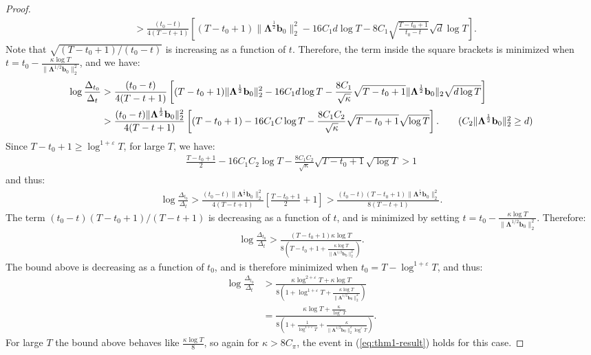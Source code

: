 \begin{proof}
\begin{align*}
    &> \frac{(t_0 - t) }{4(T-t+1)}\left[(T-t_0+1)\lVert\boldsymbol{\Lambda}^{\frac{1}{2}} \mathbf{b}_0\rVert^2_2 -16C_1d\log T - 8C_1\sqrt{\frac{T-t_0+1}{t_0-t}}\sqrt{d}\log T\right]. \tag{$T-t+1 > T - t_0+1$}
\end{align*}
Note that $\sqrt{(T-t_0+1)/(t_0-t)}$ is increasing as a function of $t$. Therefore, the term inside the square brackets is minimized when $t = t_0 - \frac{\kappa\log T}{\lVert\boldsymbol{\Lambda}^{1/2}\mathbf{b}_0\rVert_2^2}$, and we have:
\begin{align*}
    \log \frac{\Delta_{t_0}}{\Delta_t} &> \frac{(t_0 - t) }{4(T-t+1)}\left[(T-t_0+1)\lVert\boldsymbol{\Lambda}^{\frac{1}{2}} \mathbf{b}_0\rVert^2_2 -16C_1d\log T - \frac{8C_1}{\sqrt{\kappa}}\sqrt{T-t_0+1}\lVert\boldsymbol{\Lambda}^{\frac{1}{2}} \mathbf{b}_0\rVert_2\sqrt{d\log T}\right] \\
    &> \frac{(t_0 - t) \lVert\boldsymbol{\Lambda}^{\frac{1}{2}} \mathbf{b}_0\rVert^2_2}{4(T-t+1)}\left[(T-t_0+1) -16C_1C\log T - \frac{8C_1C_2 }{\sqrt{\kappa}}\sqrt{T-t_0+1}\sqrt{\log T}\right]. \tag{$C_2 \lVert\boldsymbol{\Lambda}^{\frac{1}{2}}\mathbf{b}_0\rVert_2^2 \geq d$}
\end{align*}
Since $T-t_0+1\geq \log^{1+\varepsilon} T$, for large $T$, we have: 
\begin{align*}
    \frac{T-t_0+1}{2} -16C_1C_2 \log T - \frac{8C_1C_2 }{\sqrt{\kappa}}\sqrt{T-t_0+1}\sqrt{\log T} > 1
\end{align*}
and thus:
\begin{align*}
    \log \frac{\Delta_{t_0}}{\Delta_t} > \frac{(t_0 - t) \lVert\boldsymbol{\Lambda}^{\frac{1}{2}} \mathbf{b}_0\rVert^2_2}{4(T-t+1)} \left[\frac{T-t_0+1}{2} + 1 \right ] >\frac{(t_0 - t)(T-t_0+1) \lVert\boldsymbol{\Lambda}^{\frac{1}{2}} \mathbf{b}_0\rVert^2_2}{8(T-t+1)}.
\end{align*}
The term $(t_0 - t)(T-t_0+1) / (T-t+1)$ is decreasing as a function of $t$, and is minimized by setting  $t = t_0 - \frac{\kappa\log T}{\lVert\boldsymbol{\Lambda}^{1/2}\mathbf{b}_0\rVert_2^2}$. Therefore:
\begin{align*}
    \log \frac{\Delta_{t_0}}{\Delta_t} > \frac{(T-t_0+1) \kappa\log T}{8\left(T-t_0+1 + \frac{\kappa\log T}{\lVert\boldsymbol{\Lambda}^{1/2}\mathbf{b}_0\rVert_2^2} \right)}.
\end{align*}
The bound above is decreasing as a function of $t_0$, and is therefore minimized when $t_0 = T - \log^{1+\varepsilon} T$, and thus:
\begin{align*}
    \log \frac{\Delta_{t_0}}{\Delta_t} &> \frac{\kappa\log^{2+\varepsilon} T + \kappa \log T}{8\left(1 + \log^{1+\varepsilon} T + \frac{\kappa\log T}{\lVert\boldsymbol{\Lambda}^{1/2}\mathbf{b}_0\rVert_2^2} \right)} \\
    &= \frac{\kappa\log T + \frac{\kappa}{\log^\varepsilon T}}{8\left(1 +\frac{1}{\log^{1+\varepsilon} T}+ \frac{\kappa}{\lVert\boldsymbol{\Lambda}^{1/2}\mathbf{b}_0\rVert_2^2\log^{\varepsilon} T} \right)}.
\end{align*}
For large $T$ the bound above behaves like $\frac{\kappa \log T}{8}$, so again for $\kappa > 8 C_\pi$, the event in (\ref{eq:thm1-result}) holds for this case.

\end{proof}